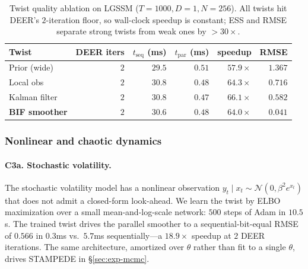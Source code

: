 \documentclass{article}
\begin{document}
\begin{table}[t]
\caption{Twist quality ablation on LGSSM ($T=1000, D=1, N=256$). All twists hit DEER's $2$-iteration floor, so wall-clock speedup is constant; ESS and RMSE separate strong twists from weak ones by $> 30\times$.}
\label{tab:twist-ablation}
\centering
\small
\begin{tabular}{lrrrrr}
\toprule
Twist & DEER iters & $t_{\text{seq}}$ (ms) & $t_{\text{par}}$ (ms) & speedup & RMSE \\
\midrule
Prior (wide)        & $2$ & $29.5$ & $0.51$ & $57.9\times$ & $1.367$ \\
Local obs           & $2$ & $30.8$ & $0.48$ & $64.3\times$ & $0.716$ \\
Kalman filter       & $2$ & $30.8$ & $0.47$ & $66.1\times$ & $0.582$ \\
\textbf{BIF smoother} & $2$ & $30.6$ & $0.48$ & $64.0\times$ & $\mathbf{0.041}$ \\
\bottomrule
\end{tabular}
\end{table}

\subsubsection{Nonlinear and chaotic dynamics}
\label{sec:exp-nonlinear}

\paragraph{C3a. Stochastic volatility.} The stochastic volatility model has a nonlinear observation $y_t \mid x_t \sim \mathcal{N}(0, \beta^2 e^{x_t})$ that does not admit a closed-form look-ahead. We learn the twist by ELBO maximization over a small mean-and-log-scale network: $500$ steps of Adam in $10.5$s. The trained twist drives the parallel smoother to a sequential-bit-equal RMSE of $0.566$ in $0.3$ms vs.\ $5.7$ms sequentially---a $\mathbf{18.9\times}$ speedup at $2$ DEER iterations. The same architecture, amortized over $\theta$ rather than fit to a single $\theta$, drives STAMPEDE in \S\ref{sec:exp-mcmc}.
\end{document}
